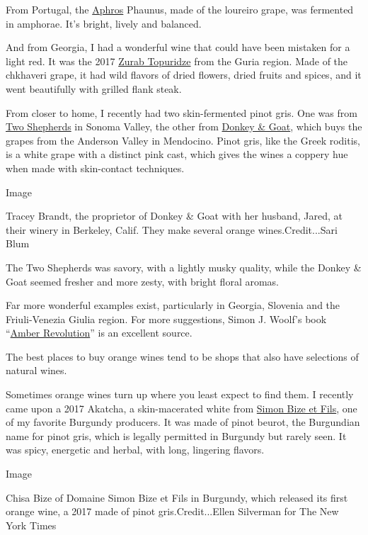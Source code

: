 From Portugal, the \href{https://aphros-wine.com/en/}{Aphros} Phaunus,
made of the loureiro grape, was fermented in amphorae. It's bright,
lively and balanced.

And from Georgia, I had a wonderful wine that could have been mistaken
for a light red. It was the 2017 \href{https://www.iberieli.com/}{Zurab
Topuridze} from the Guria region. Made of the chkhaveri grape, it had
wild flavors of dried flowers, dried fruits and spices, and it went
beautifully with grilled flank steak.

From closer to home, I recently had two skin-fermented pinot gris. One
was from \href{https://www.twoshepherds.com/}{Two Shepherds} in Sonoma
Valley, the other from \href{https://www.donkeyandgoat.com/}{Donkey \&
Goat}, which buys the grapes from the Anderson Valley in Mendocino.
Pinot gris, like the Greek roditis, is a white grape with a distinct
pink cast, which gives the wines a coppery hue when made with
skin-contact techniques.

Image

Tracey Brandt, the proprietor of Donkey \& Goat with her husband, Jared,
at their winery in Berkeley, Calif. They make several orange
wines.Credit...Sari Blum

The Two Shepherds was savory, with a lightly musky quality, while the
Donkey \& Goat seemed fresher and more zesty, with bright floral aromas.

Far more wonderful examples exist, particularly in Georgia, Slovenia and
the Friuli-Venezia Giulia region. For more suggestions, Simon J. Woolf's
book ``\href{https://amber-revolution.com/}{Amber Revolution}'' is an
excellent source.

The best places to buy orange wines tend to be shops that also have
selections of natural wines.

Sometimes orange wines turn up where you least expect to find them. I
recently came upon a 2017 Akatcha, a skin-macerated white from
\href{https://www.domainebize.fr/en/the-domain.html}{Simon Bize et
Fils}, one of my favorite Burgundy producers. It was made of pinot
beurot, the Burgundian name for pinot gris, which is legally permitted
in Burgundy but rarely seen. It was spicy, energetic and herbal, with
long, lingering flavors.

Image

Chisa Bize of Domaine Simon Bize et Fils in Burgundy, which released its
first orange wine, a 2017 made of pinot gris.Credit...Ellen Silverman
for The New York Times


